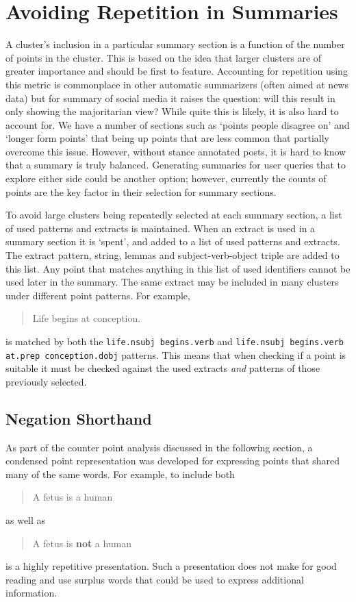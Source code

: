   \section{Avoiding Repetition in Summaries}
    A cluster's inclusion in a particular summary section is a function of the number of points in the cluster. This is based on the idea that larger clusters are of greater importance and should be first to feature. Accounting for repetition using this metric is commonplace in other automatic summarizers (often aimed at news data) but for summary of social media it raises the question: will this result in only showing the majoritarian view? While quite this is likely, it is also hard to account for. We have a number of sections such as `points people disagree on' and `longer form points' that being up points that are less common that partially overcome this issue. However, without stance annotated posts, it is hard to know that a summary is truly balanced. Generating summaries for user queries that to explore either side could be another option; however, currently the counts of points are the key factor in their selection for summary sections.

    To avoid large clusters being repeatedly selected at each summary section, a list of used patterns and extracts is maintained. When an extract is used in a summary section it is `spent', and added to a list of used patterns and extracts. The extract pattern, string, lemmas and subject-verb-object triple are added to this list. Any point that matches anything in this list of used identifiers cannot be used later in the summary. The same extract may be included in many clusters under different point patterns. For example, \blockquote{Life begins at conception.} is matched by both the \texttt{life.nsubj begins.verb} and \texttt{life.nsubj begins.verb at.prep conception.dobj} patterns. This means that when checking if a point is suitable it must be checked against the used extracts \textit{and} patterns of those previously selected.

    \tocless\subsection{Negation Shorthand}
      As part of the counter point analysis discussed in the following section, a condensed point representation was developed for expressing points that shared many of the same words. For example, to include both \blockquote{A fetus is a human} as well as \blockquote{A fetus is \textbf{not} a human} is a highly repetitive presentation. Such a presentation does not make for good reading and use surplus words that could be used to express additional information.

